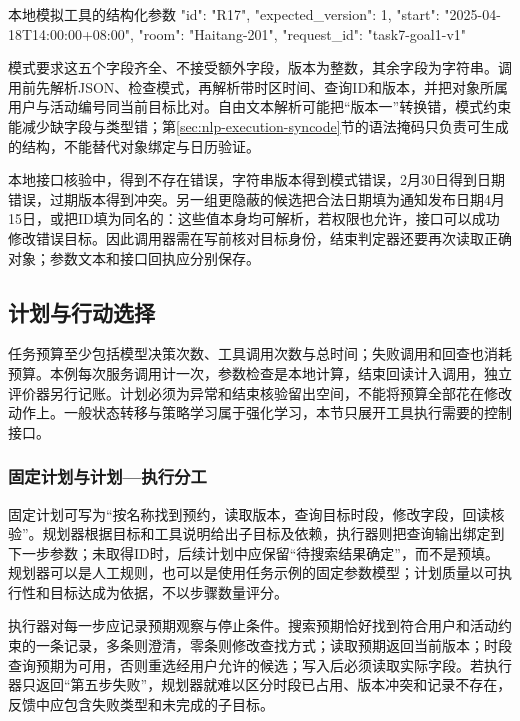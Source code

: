 \begin{codeblock}[label={code:nlp-execution-tool-request}]{本地模拟工具的结构化参数}
{
  "id": "R17",
  "expected_version": 1,
  "start": "2025-04-18T14:00:00+08:00",
  "room": "Haitang-201",
  "request_id": "task7-goal1-v1"
}
\end{codeblock}

模式要求这五个字段齐全、不接受额外字段，版本为整数，其余字段为字符串。调用前先解析JSON、检查模式，再解析带时区时间、查询ID和版本，并把对象所属用户与活动编号同当前目标比对。自由文本解析可能把“版本一”转换错，模式约束能减少缺字段与类型错；第\ref{sec:nlp-execution-syncode}节的语法掩码只负责可生成的结构，不能替代对象绑定与日历验证。

本地接口核验中，得到不存在错误，字符串版本得到模式错误，2月30日得到日期错误，过期版本得到冲突。另一组更隐蔽的候选把合法日期填为通知发布日期4月15日，或把ID填为同名的：这些值本身均可解析，若权限也允许，接口可以成功修改错误目标。因此调用器需在写前核对目标身份，结束判定器还要再次读取正确对象；参数文本和接口回执应分别保存。

\subsection{计划与行动选择}
\label{sec:nlp-execution-planning}

任务预算至少包括模型决策次数、工具调用次数与总时间；失败调用和回查也消耗预算。本例每次服务调用计一次，参数检查是本地计算，结束回读计入调用，独立评价器另行记账。计划必须为异常和结束核验留出空间，不能将预算全部花在修改动作上。一般状态转移与策略学习属于强化学习，本节只展开工具执行需要的控制接口。

\subsubsection{固定计划与计划—执行分工}
\label{sec:nlp-execution-plan-execute}

固定计划可写为“按名称找到预约，读取版本，查询目标时段，修改字段，回读核验”。规划器根据目标和工具说明给出子目标及依赖，执行器则把查询输出绑定到下一步参数；未取得ID时，后续计划中应保留“待搜索结果确定”，而不是预填。规划器可以是人工规则，也可以是使用任务示例的固定参数模型；计划质量以可执行性和目标达成为依据，不以步骤数量评分。

执行器对每一步应记录预期观察与停止条件。搜索预期恰好找到符合用户和活动约束的一条记录，多条则澄清，零条则修改查找方式；读取预期返回当前版本；时段查询预期为可用，否则重选经用户允许的候选；写入后必须读取实际字段。若执行器只返回“第五步失败”，规划器就难以区分时段已占用、版本冲突和记录不存在，反馈中应包含失败类型和未完成的子目标。

